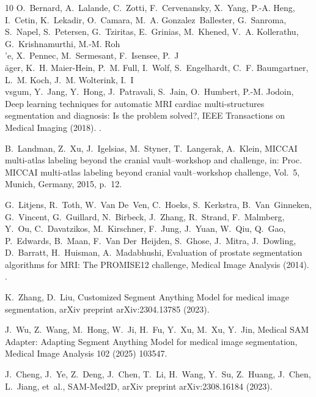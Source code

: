 \documentclass[preprint,12pt]{elsarticle}
\begin{document}
\begin{thebibliography}{10}
O.~Bernard, A.~Lalande, C.~Zotti, F.~Cervenansky, X.~Yang, P.-A. Heng,
  I.~Cetin, K.~Lekadir, O.~Camara, M.~A. Gonzalez~Ballester, G.~Sanroma,
  S.~Napel, S.~Petersen, G.~Tziritas, E.~Grinias, M.~Khened, V.~A. Kollerathu,
  G.~Krishnamurthi, M.-M. Roh{\\'e}, X.~Pennec, M.~Sermesant, F.~Isensee,
  P.~J{\\\"a}ger, K.~H. Maier-Hein, P.~M. Full, I.~Wolf, S.~Engelhardt, C.~F.
  Baumgartner, L.~M. Koch, J.~M. Wolterink, I.~I{\\v{s}}gum, Y.~Jang, Y.~Hong,
  J.~Patravali, S.~Jain, O.~Humbert, P.-M. Jodoin, Deep learning techniques for
  automatic {MRI} cardiac multi-structures segmentation and diagnosis: Is the
  problem solved?, IEEE Transactions on Medical Imaging (2018).
\newblock \href {https://doi.org/10.1109/TMI.2018.2837502}
  {}.

B.~Landman, Z.~Xu, J.~Igelsias, M.~Styner, T.~Langerak, A.~Klein, {MICCAI}
  multi-atlas labeling beyond the cranial vault--workshop and challenge, in:
  Proc. MICCAI multi-atlas labeling beyond cranial vault--workshop challenge,
  Vol.~5, Munich, Germany, 2015, p.~12.

G.~Litjens, R.~Toth, W.~Van De~Ven, C.~Hoeks, S.~Kerkstra, B.~Van~Ginneken,
  G.~Vincent, G.~Guillard, N.~Birbeck, J.~Zhang, R.~Strand, F.~Malmberg, Y.~Ou,
  C.~Davatzikos, M.~Kirschner, F.~Jung, J.~Yuan, W.~Qiu, Q.~Gao, P.~Edwards,
  B.~Maan, F.~Van Der~Heijden, S.~Ghose, J.~Mitra, J.~Dowling, D.~Barratt,
  H.~Huisman, A.~Madabhushi, Evaluation of prostate segmentation algorithms for
  {MRI}: The {PROMISE12} challenge, Medical Image Analysis (2014).
\newblock \href {https://doi.org/10.1016/j.media.2013.12.002}
  {}.

K.~Zhang, D.~Liu, Customized {Segment} {Anything} {Model} for medical image
  segmentation, arXiv preprint arXiv:2304.13785 (2023).

J.~Wu, Z.~Wang, M.~Hong, W.~Ji, H.~Fu, Y.~Xu, M.~Xu, Y.~Jin, {Medical SAM
  Adapter}: Adapting {Segment Anything Model} for medical image segmentation,
  Medical Image Analysis 102 (2025) 103547.

J.~Cheng, J.~Ye, Z.~Deng, J.~Chen, T.~Li, H.~Wang, Y.~Su, Z.~Huang, J.~Chen,
  L.~Jiang, et~al., {SAM-Med2D}, arXiv preprint arXiv:2308.16184 (2023).


\end{thebibliography}
\end{document}
